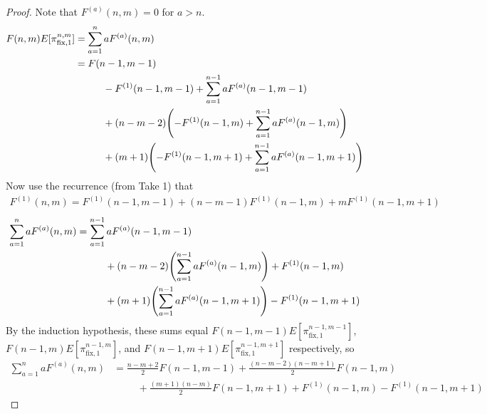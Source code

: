 \documentclass{article}
\let\originalleft\left
\let\originalright\right
\renewcommand{\left}{\mathopen{}\mathclose\bgroup\originalleft}
\renewcommand{\right}{\aftergroup\egroup\originalright}
\begin{document}
  \begin{proof}
    Note that $F^{(a)}(n, m) = 0$ for $a > n$.
    \begin{align}
      F(n,m)E[\pi_{\text{fix},1}^{n,m}]
      &= \sum_{a=1}^n aF^{(a)}(n, m) \\
      &= F(n-1, m-1) \\
      &\hspace{1cm} - F^{(1)}(n-1, m-1) + \sum_{a=1}^{n-1} a F^{(a)}(n-1, m-1) \\
      &\hspace{1cm} + (n - m - 2)\left(-F^{(1)}(n-1, m)   + \sum_{a=1}^{n-1} a F^{(a)}(n-1, m)\right) \\
      &\hspace{1cm} + (m + 1)    \left(-F^{(1)}(n-1, m+1) + \sum_{a=1}^{n-1} a F^{(a)}(n-1, m+1)\right)
    \end{align}
      Now use the recurrence (from Take 1) that \begin{align}
      F^{(1)}(n, m) = F^{(1)}(n - 1, m-1) +
        (n - m - 1)F^{(1)}(n - 1, m) +
        mF^{(1)}(n-1, m + 1)
      \end{align}
    \begin{align}
      \sum_{a=1}^n aF^{(a)}(n, m)
      &= \sum_{a=1}^{n-1} a F^{(a)}(n-1, m-1) \\
      &\hspace{1cm} + (n - m - 2)\left(\sum_{a=1}^{n-1} a F^{(a)}(n-1, m)\right) + F^{(1)}(n-1, m)\\
      &\hspace{1cm} + (m + 1)\left(\sum_{a=1}^{n-1} a F^{(a)}(n-1, m+1)\right) -F^{(1)}(n-1, m+1)
    \end{align}
    By the induction hypothesis, these sums equal $F(n-1, m-1)E[\pi_{\text{fix},1}^{n-1,m-1}]$, $F(n-1, m)E[\pi_{\text{fix},1}^{n-1,m}]$, and $F(n-1, m + 1)E[\pi_{\text{fix},1}^{n-1,m + 1}]$ respectively, so
    \begin{align}
      \sum_{a=1}^n aF^{(a)}(n, m)
      &= \frac{n-m+2}{2}F(n-1, m-1) + \frac{(n-m-2)(n-m+1)}{2}F(n-1, m) \\
      &\hspace{1cm}
      + \frac{(m+1)(n-m)}{2}F(n-1, m+1)
      + F^{(1)}(n-1, m)
      - F^{(1)}(n-1, m+1)
    \end{align}
  \end{proof}
\end{document}

